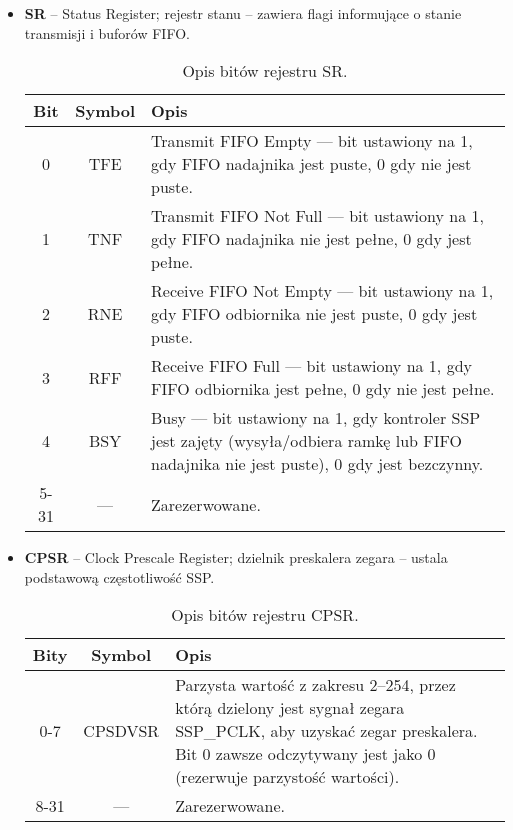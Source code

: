 \begin{itemize}
  
  \item \textbf{SR} – Status Register; rejestr stanu – zawiera flagi informujące o stanie transmisji i buforów FIFO.

\begin{table}[H]
\centering
\caption{Opis bitów rejestru SR.}
\vspace{0.5em}
\renewcommand{\arraystretch}{1.2}
\begin{tabular}{|c|c|p{9.5cm}|}
\hline
\textbf{Bit} & \textbf{Symbol} & \textbf{Opis} \\
\hline
0 & TFE & Transmit FIFO Empty — bit ustawiony na 1, gdy FIFO nadajnika jest puste, 0 gdy nie jest puste.  \\
\hline
1 & TNF & Transmit FIFO Not Full — bit ustawiony na 1, gdy FIFO nadajnika nie jest pełne, 0 gdy jest pełne.  \\
\hline
2 & RNE & Receive FIFO Not Empty — bit ustawiony na 1, gdy FIFO odbiornika nie jest puste, 0 gdy jest puste.  \\
\hline
3 & RFF & Receive FIFO Full — bit ustawiony na 1, gdy FIFO odbiornika jest pełne, 0 gdy nie jest pełne.  \\
\hline
4 & BSY & Busy — bit ustawiony na 1, gdy kontroler SSP jest zajęty (wysyła/odbiera ramkę lub FIFO nadajnika nie jest puste), 0 gdy jest bezczynny.  \\
\hline
5-31 & — & Zarezerwowane.  \\
\hline
\end{tabular}
\end{table}

  
  \item \textbf{CPSR} – Clock Prescale Register; dzielnik preskalera zegara – ustala podstawową częstotliwość SSP.

\begin{table}[H]
\centering
\caption{Opis bitów rejestru CPSR.}
\vspace{0.5em}
\renewcommand{\arraystretch}{1.2}
\begin{tabular}{|c|c|p{9.5cm}|}
\hline
\textbf{Bity} & \textbf{Symbol} & \textbf{Opis} \\
\hline
0-7 & CPSDVSR & Parzysta wartość z zakresu 2–254, przez którą dzielony jest sygnał zegara SSP\_PCLK, aby uzyskać zegar preskalera. Bit 0 zawsze odczytywany jest jako 0 (rezerwuje parzystość wartości). \\
\hline
8-31 & — & Zarezerwowane.\\
\hline
\end{tabular}
\end{table}


\end{itemize}
